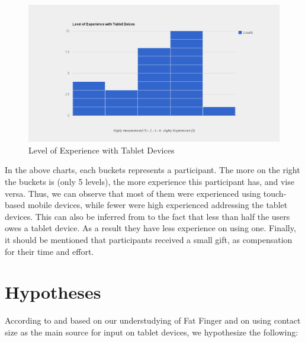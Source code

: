 \begin{figure}[H]
\centering
\includegraphics[scale=0.3]{figures/experienceTablet.png}
\caption{Level of Experience with Tablet Devices}
\label{fig:experienceTablet}
\end{figure}

In the above charts, each buckets represents a participant. The more on the right the buckets is (only 5 levels), the more experience this participant has, and vise versa. Thus, we can observe that most of them were experienced using touch-based mobile devices, while fewer were high experienced addressing the tablet devices. This can also be inferred from to the fact that less than half the users owes a tablet device. As a result they have less experience on using one. Finally, it should be mentioned that participants received a small gift, as compensation for their time and effort.




\section{Hypotheses}
\label{sec:hypotheses}

According to and based on our understudying of Fat Finger and on using contact size as the main source for input on tablet devices, we hypothesize the following:

